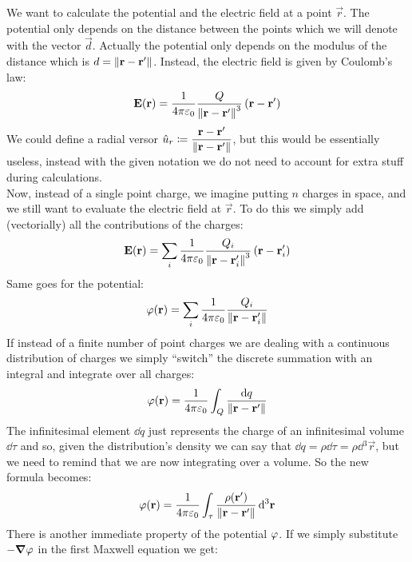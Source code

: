 We want to calculate the potential and the electric field at a point $\vec{r}$. The potential only depends on the distance between the points which we will denote with the vector $\vec{d}$. Actually the potential only depends on the modulus of the distance which is $d = \norm{\vb{r}-\vb{r}'}$. Instead, the electric field is given by Coulomb's law:
\begin{equation}
  \vb{E}(\vb{r}) = \dfrac{1}{4 \pi \varepsilon_0}\dfrac{Q}{\norm{\vb{r}-\vb{r}'}^3}\left(\vb{r}-\vb{r}'\right)
\end{equation}
We could define a radial versor $\hat{u}_r \coloneqq \dfrac{\vb{r}-\vb{r}'}{\norm{\vb{r}-\vb{r}'}}$, but this would be essentially useless, instead with the given notation we do not need to account for extra stuff during calculations.\\
Now, instead of a single point charge, we imagine putting $n$ charges in space, and we still want to evaluate the electric field at $\vec{r}$. To do this we simply add (vectorially) all the contributions of the charges:
\begin{equation}
  \vb{E}(\vb{r}) = \displaystyle\sum_i\dfrac{1}{4 \pi \varepsilon_0}\dfrac{Q_i}{\norm{\vb{r}-\vb{r}_i'}^3}\left(\vb{r}-\vb{r}_i'\right)
\end{equation}
Same goes for the potential:
\begin{equation}
  \varphi(\vb{r}) = \displaystyle\sum_i\dfrac{1}{4 \pi \varepsilon_0}\dfrac{Q_i}{\norm{\vb{r}-\vb{r}_i'}}
\end{equation}
If instead of a finite number of point charges we are dealing with a continuous distribution of charges we simply ``switch'' the discrete summation with an integral and integrate over all charges:
\begin{equation}
  \varphi(\vb{r}) = \dfrac{1}{4 \pi \varepsilon_0}\int_Q \dfrac{\dd{q}}{\norm{\vb{r}-\vb{r}'}}
\end{equation}
The infinitesimal element $\dd{q}$ just represents the charge of an infinitesimal volume $\dd{\tau}$ and so, given the distribution's density we can say that $\dd{q} = \rho \dd{\tau} = \rho \dd{^3 \vec{r}}$, but we need to remind that we are now integrating over a volume. So the new formula becomes:
\begin{equation} \label{e:general_sol_poisson}
  \varphi(\vb{r}) = \dfrac{1}{4 \pi \varepsilon_0}\int_{\tau} \dfrac{\rho (\vb{r}')}{\norm{\vb{r}-\vb{r}'}}\dd{^3 \vb{r}}
\end{equation}
There is another immediate property of the potential $\varphi$. If we simply substitute $-\grad{\varphi}$ in the first Maxwell equation we get:
